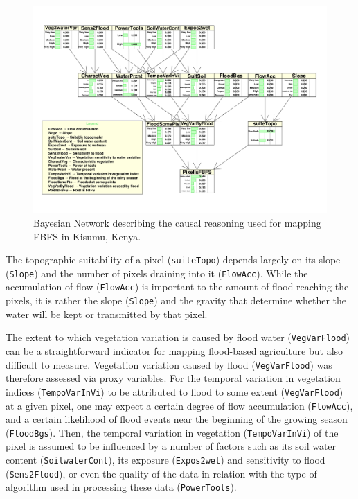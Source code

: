\documentclass[12pt,oneside]{article}
\begin{document}
\begin{figure}
\includegraphics[width=1\linewidth]{figures/Mapping_FBFS_bayesian_network} \caption{Bayesian Network describing the causal reasoning used for mapping FBFS in Kisumu, Kenya.}\label{fig:fig1}
\end{figure}

The topographic suitability of a pixel (\texttt{suiteTopo}) depends largely on its slope (\texttt{Slope}) and the number of pixels draining into it (\texttt{FlowAcc}). While the accumulation of flow (\texttt{FlowAcc}) is important to the amount of flood reaching the pixels, it is rather the slope (\texttt{Slope}) and the gravity that determine whether the water will be kept or transmitted by that pixel.

The extent to which vegetation variation is caused by flood water (\texttt{VegVarFlood}) can be a straightforward indicator for mapping flood-based agriculture but also difficult to measure. Vegetation variation caused by flood (\texttt{VegVarFlood}) was therefore assessed via proxy variables. For the temporal variation in vegetation indices (\texttt{TempoVarInVi}) to be attributed to flood to some extent (\texttt{VegVarFlood}) at a given pixel, one may expect a certain degree of flow accumulation (\texttt{FlowAcc}), and a certain likelihood of flood events near the beginning of the growing season (\texttt{FloodBgs}). Then, the temporal variation in vegetation (\texttt{TempoVarInVi}) of the pixel is assumed to be influenced by a number of factors such as its soil water content (\texttt{SoilwaterCont}), its exposure (\texttt{Expos2wet}) and sensitivity to flood (\texttt{Sens2Flood}), or even the quality of the data in relation with the type of algorithm used in processing these data (\texttt{PowerTools}).
\end{document}
